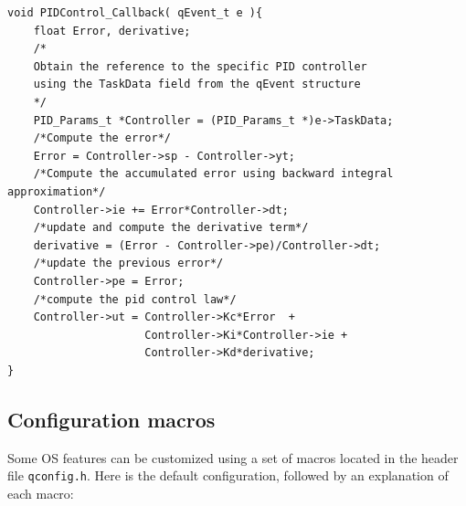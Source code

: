 \documentclass{article}
\begin{document}
\begin{lstlisting}[style=CStyle]
void PIDControl_Callback( qEvent_t e ){
    float Error, derivative;
    /* 
    Obtain the reference to the specific PID controller 
    using the TaskData field from the qEvent structure
    */
    PID_Params_t *Controller = (PID_Params_t *)e->TaskData; 
    /*Compute the error*/
    Error = Controller->sp - Controller->yt;
    /*Compute the accumulated error using backward integral approximation*/
    Controller->ie += Error*Controller->dt;
    /*update and compute the derivative term*/
    derivative = (Error - Controller->pe)/Controller->dt;
    /*update the previous error*/
    Controller->pe = Error;
    /*compute the pid control law*/
    Controller->ut = Controller->Kc*Error  +  
                     Controller->Ki*Controller->ie + 
                     Controller->Kd*derivative;
}
\end{lstlisting}

\newpage

\subsection{Configuration macros}
Some  OS features can be customized using a set of macros located in the header file \lstinline{qconfig.h}. Here is the default configuration, followed by an explanation of each macro: \\
\end{document}
